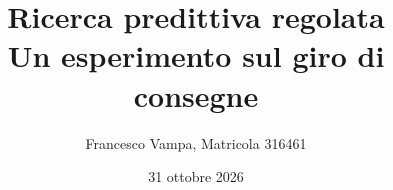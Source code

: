 \documentclass[11pt,a4paper]{article}
\title{Ricerca predittiva regolata\\\large Un esperimento sul giro di consegne}
\author{Francesco Vampa, Matricola 316461}
\date{31 ottobre 2026}
\begin{document}
\maketitle









\FloatBarrier

\clearpage

\end{document}
